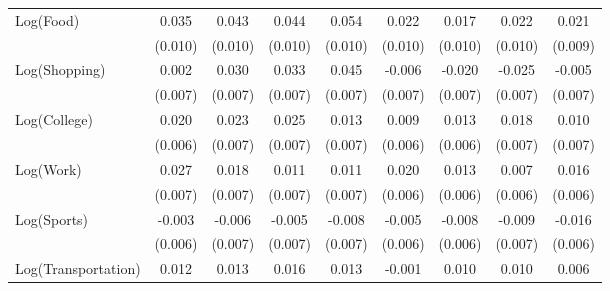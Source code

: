 {\begin{tabular}{l*{8}{c}}
Log(Food)           &       0.035\sym{***}&       0.043\sym{***}&       0.044\sym{***}&       0.054\sym{***}&       0.022\sym{**} &       0.017\sym{*}  &       0.022\sym{**} &       0.021\sym{**} \\
                    &     (0.010)         &     (0.010)         &     (0.010)         &     (0.010)         &     (0.010)         &     (0.010)         &     (0.010)         &     (0.009)         \\
Log(Shopping)       &       0.002         &       0.030\sym{***}&       0.033\sym{***}&       0.045\sym{***}&      -0.006         &      -0.020\sym{***}&      -0.025\sym{***}&      -0.005         \\
                    &     (0.007)         &     (0.007)         &     (0.007)         &     (0.007)         &     (0.007)         &     (0.007)         &     (0.007)         &     (0.007)         \\
Log(College)        &       0.020\sym{***}&       0.023\sym{***}&       0.025\sym{***}&       0.013\sym{*}  &       0.009         &       0.013\sym{**} &       0.018\sym{**} &       0.010         \\
                    &     (0.006)         &     (0.007)         &     (0.007)         &     (0.007)         &     (0.006)         &     (0.006)         &     (0.007)         &     (0.007)         \\
Log(Work)           &       0.027\sym{***}&       0.018\sym{**} &       0.011\sym{*}  &       0.011\sym{*}  &       0.020\sym{***}&       0.013\sym{**} &       0.007         &       0.016\sym{**} \\
                    &     (0.007)         &     (0.007)         &     (0.007)         &     (0.007)         &     (0.006)         &     (0.006)         &     (0.006)         &     (0.006)         \\
Log(Sports)         &      -0.003         &      -0.006         &      -0.005         &      -0.008         &      -0.005         &      -0.008         &      -0.009         &      -0.016\sym{**} \\
                    &     (0.006)         &     (0.007)         &     (0.007)         &     (0.007)         &     (0.006)         &     (0.006)         &     (0.007)         &     (0.006)         \\
Log(Transportation) &       0.012\sym{*}  &       0.013\sym{*}  &       0.016\sym{**} &       0.013\sym{*}  &      -0.001         &       0.010         &       0.010         &       0.006         \\

\end{tabular}}
